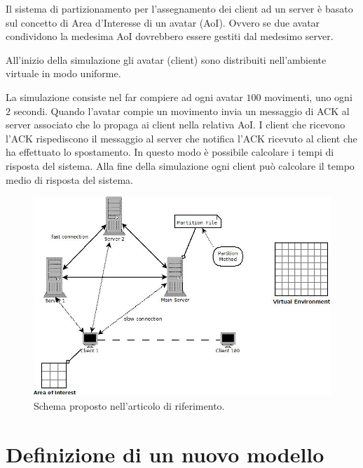 \documentclass[a4paper, 11pt, oneside]{book}
\theoremstyle{definition}
\theoremstyle{remark}
\begin{document}
Il sistema di partizionamento per l'assegnamento dei client ad un server è
basato sul concetto di Area d'Interesse di un avatar (AoI). Ovvero se due
avatar condividono la medesima AoI dovrebbero essere gestiti dal medesimo
server.

All'inizio della simulazione gli avatar (client) sono distribuiti nell'ambiente
virtuale in modo uniforme.

La simulazione consiste nel far compiere ad ogni avatar $100$ movimenti, uno
ogni $2$ secondi. Quando l'avatar compie un movimento invia un messaggio di
ACK al server associato che lo propaga ai client nella relativa AoI.
I client che ricevono l'ACK rispediscono il messaggio al server che notifica
l'ACK ricevuto al client che ha effettuato lo spostamento. In questo modo è
possibile calcolare i tempi di risposta del sistema.
Alla fine della simulazione ogni client può calcolare il tempo medio di
risposta del sistema.

\begin{figure}
\label{fig1}
\begin{center}
\includegraphics[scale=0.50]{schema.jpeg}
\end{center}
\caption{Schema proposto nell'articolo di riferimento.}
\end{figure}


\section{Definizione di un nuovo modello}
\end{document}
